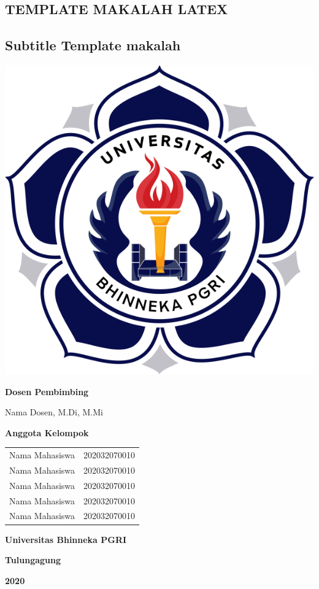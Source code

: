 \begin{center}
    \section*{TEMPLATE MAKALAH LATEX}
    \subsection*{Subtitle Template makalah}

    \bigskip
    \bigskip
    \bigskip
    
    \includegraphics[scale=2]{gambar/logo.png}

    \bigskip
    \bigskip

    \textbf{Dosen Pembimbing}
    \par
    Nama Dosen, M.Di, M.Mi

    \bigskip
    \bigskip

    \textbf{Anggota Kelompok}
    \par
    \begin{tabular}{ c c }
        Nama Mahasiswa & 202032070010 \\
        Nama Mahasiswa & 202032070010 \\
        Nama Mahasiswa & 202032070010 \\
        Nama Mahasiswa & 202032070010 \\
        Nama Mahasiswa & 202032070010
    \end{tabular}

    \bigskip
    \bigskip
    \bigskip

    \textbf{Universitas Bhinneka PGRI}
    \par
    \textbf{Tulungagung}
    \par
    \textbf{2020}
\end{center}

